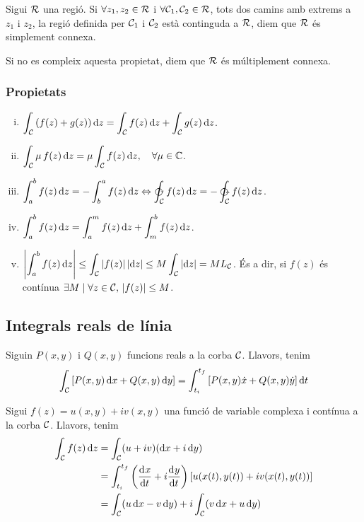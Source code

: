 \begin{defi}
    Sigui $\mathcal{R}$ una regió. Si $\forall z_{1}, z_{2} \in \mathcal{R}$ i $\forall \mathcal{C}_{1}, \mathcal{C}_{2} \in \mathcal{R}$, tots dos camins amb extrems a $z_{1}$ i  $z_{2}$, la regió definida per $\mathcal{C}_{1}$ i $\mathcal{C}_{2}$ està continguda a $\mathcal{R}$, diem que $\mathcal{R}$ és simplement connexa.
    
    Si no es compleix aquesta propietat, diem que $\mathcal{R}$ és múltiplement connexa.
\end{defi}

\subsubsection*{Propietats}
\begin{enumerate}[i)]
    \item $\displaystyle \int_{\mathcal{C}} \left( f(z) + g(z) \right) \mathop{}\!\mathrm{d} z = \displaystyle \int_{\mathcal{C}} f(z) \mathop{}\!\mathrm{d} z + \displaystyle \int_{\mathcal{C}} g(z) \mathop{}\!\mathrm{d} z$.
    \item $\displaystyle \int_{\mathcal{C}} \mu \, f(z) \mathop{}\!\mathrm{d} z = \mu \displaystyle \int_{\mathcal{C}} f(z) \mathop{}\!\mathrm{d} z, \quad \forall \mu \in \mathbb{C}$.
    \item $\displaystyle \int_{a}^{b} f(z) \diff z = - \int_{b}^{a} f(z) \diff z \Leftrightarrow \cwoint_{\mc{C}} f(z) \diff z = - \ctrcwoint_{\mc{C}} f(z) \diff z$.
    \item $\displaystyle \int_{a}^{b} f(z) \mathop{}\!\mathrm{d} z = \int_{a}^{m} f(z) \mathop{}\!\mathrm{d} z + \int_{m}^{b} f(z) \mathop{}\!\mathrm{d} z$.
    \item $\displaystyle \left| \int_{a}^{b} f(z) \mathop{}\!\mathrm{d} z \right| \leq \int_{\mathcal{C}} \left| f(z) \right| \left| \mathop{}\!\mathrm{d} z \right| \leq M \int_{\mathcal{C}} \left| \mathop{}\!\mathrm{d} z \right| = M L_{\mathcal{C}}$. És a dir, si $f(z)$ és contínua $\exists M \mid \forall z \in \mathcal{C}, \, \left| f(z) \right| \leq M$.
\end{enumerate}

\subsection{Integrals reals de línia}
Siguin $P(x,y)$ i $Q(x,y)$ funcions reals a la corba $\mathcal{C}$. Llavors, tenim
\begin{align}
    \int_{\mathcal{C}} \left[ P(x,y) \mathop{}\!\mathrm{d} x + Q(x,y) \mathop{}\!\mathrm{d} y \right] = \int_{t_{i}}^{t_{f}} \left[ P(x,y) \dot{x} + Q(x,y) \dot{y} \right] \mathop{}\!\mathrm{d} t
\end{align}

Sigui $f(z) = u(x,y) + iv(x,y)$ una funció de variable complexa i contínua a la corba $\mathcal{C}$. Llavors, tenim
\begin{align}
\begin{aligned}
    \int_{\mathcal{C}} f(z) \mathop{}\!\mathrm{d} z &= \int_{\mathcal{C}} (u + iv) (\mathrm{d} x + i \mathop{}\!\mathrm{d} y) \\
    &= \int_{t_{i}}^{t_{f}} \left( \frac{\mathrm{d}^{}x}{\mathrm{d} t^{}} + i \frac{\mathrm{d}^{}y}{\mathrm{d} t^{}} \right) \left[ u (x(t), y(t)) + i v (x(t), y(t)) \right] \\
    & = \int_{\mathcal{C}} (u \mathop{}\!\mathrm{d} x - v \mathop{}\!\mathrm{d} y) + i \int_{\mathcal{C}} (v \mathop{}\!\mathrm{d} x + u \mathop{}\!\mathrm{d} y)
\end{aligned}
\end{align}

